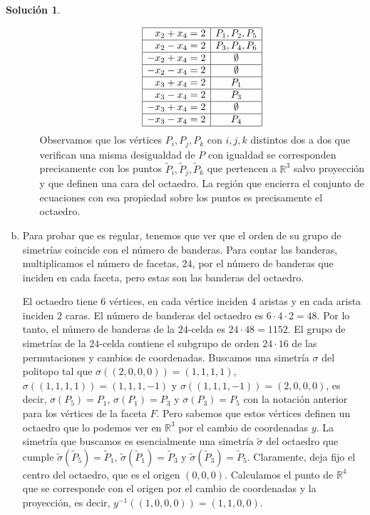 \documentclass[10pt]{article}
\theoremstyle{definition}
\newtheorem*{sol}{Solución}
\begin{document}
\begin{sol}
\begin{enumerate}[(a)]
\begin{itemize}
\[\begin{array}{|r|c|}
        \hline x_2+x_4=2 & P_1,P_2,P_5\\
        \hline x_2-x_4=2 & P_3,P_4,P_6\\
        \hline -x_2+x_4=2 & \emptyset\\
        \hline -x_2-x_4=2 & \emptyset\\
        
        \hline x_3+x_4=2 & P_1\\
        \hline x_3-x_4=2 & P_3\\
        \hline -x_3+x_4=2 & \emptyset\\
        \hline -x_3-x_4=2 & P_4\\ \hline
    \end{array}\]
    Observamos que los vértices $P_i,P_j,P_k$ con $i,j,k$ distintos dos a dos que verifican una misma desigualdad de $P$ con igualdad se corresponden precisamente con los puntos $\tilde{P}_i,\tilde{P}_j,\tilde{P}_k$ que pertencen a $\mathbb{R}^3$ salvo proyección y que definen una cara del octaedro. La región que encierra el conjunto de ecuaciones con esa propiedad sobre los puntos es precisamente el octaedro.
    \end{itemize}
    \item Para probar que es regular, tenemos que ver que el orden de su grupo de simetrías coincide con el número de banderas. Para contar las banderas, multiplicamos el número de facetas, $24$, por el número de banderas que inciden en cada faceta, pero estas son las banderas del octaedro.
    
    El octaedro tiene $6$ vértices, en cada vértice inciden $4$ aristas y en cada arista inciden $2$ caras. El número de banderas del octaedro es $6\cdot 4\cdot 2=48$. Por lo tanto, el número de banderas de la $24$-celda es $24\cdot 48=1152$.
    El grupo de simetrías de la $24$-celda contiene el subgrupo de orden $24\cdot 16$ de las permutaciones y cambios de coordenadas. Buscamos una simetría $\sigma$ del politopo tal que $\sigma((2,0,0,0))=(1,1,1,1)$, $\sigma((1,1,1,1))=(1,1,1,-1)$ y $\sigma((1,1,1,-1))=(2,0,0,0)$, es decir, $\sigma\left(P_5\right)=P_1$, $\sigma\left(P_1\right)=P_3$ y $\sigma\left(P_3\right)=P_5$ con la notación anterior para los vértices de la faceta $F$. Pero sabemos que estos vértices definen un octaedro que lo podemos ver en $\mathbb{R}^3$ por el cambio de coordenadas $y$. La simetría que buscamos es esencialmente una simetría $\tilde{\sigma}$ del octaedro que cumple $\tilde{\sigma}\left(\tilde{P}_5\right)=\tilde{P}_1$, $\tilde{\sigma}\left(\tilde{P}_1\right)=\tilde{P}_3$ y $\tilde{\sigma}\left(\tilde{P}_3\right)=\tilde{P}_5$. Claramente, deja fijo el centro del octaedro, que es el origen $(0,0,0)$. Calculamos el punto de $\mathbb{R}^4$ que se corresponde con el origen por el cambio de coordenadas y la proyección, es decir, $y^{-1}((1,0,0,0))=(1,1,0,0)$.
    

\end{enumerate}
\end{sol}
\end{document}
